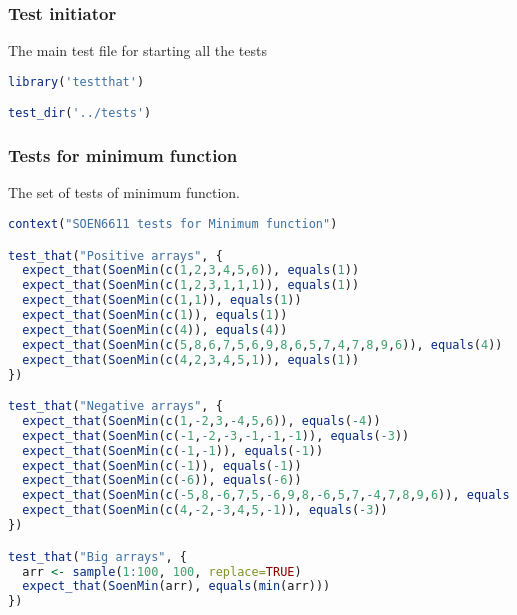 \documentclass[12pt]{article}
\begin{document}
\subsubsection{Test initiator}
The main test file for starting all the tests
\begin{lstlisting}[language=R]
library('testthat')

test_dir('../tests')
\end{lstlisting}
\subsubsection{Tests for minimum function}
The set of tests of minimum function.
\begin{lstlisting}[language=R]
context("SOEN6611 tests for Minimum function")

test_that("Positive arrays", {
  expect_that(SoenMin(c(1,2,3,4,5,6)), equals(1))
  expect_that(SoenMin(c(1,2,3,1,1,1)), equals(1))
  expect_that(SoenMin(c(1,1)), equals(1))
  expect_that(SoenMin(c(1)), equals(1))
  expect_that(SoenMin(c(4)), equals(4))
  expect_that(SoenMin(c(5,8,6,7,5,6,9,8,6,5,7,4,7,8,9,6)), equals(4))
  expect_that(SoenMin(c(4,2,3,4,5,1)), equals(1))
})

test_that("Negative arrays", {
  expect_that(SoenMin(c(1,-2,3,-4,5,6)), equals(-4))
  expect_that(SoenMin(c(-1,-2,-3,-1,-1,-1)), equals(-3))
  expect_that(SoenMin(c(-1,-1)), equals(-1))
  expect_that(SoenMin(c(-1)), equals(-1))
  expect_that(SoenMin(c(-6)), equals(-6))
  expect_that(SoenMin(c(-5,8,-6,7,5,-6,9,8,-6,5,7,-4,7,8,9,6)), equals(-6))
  expect_that(SoenMin(c(4,-2,-3,4,5,-1)), equals(-3))
})

test_that("Big arrays", {
  arr <- sample(1:100, 100, replace=TRUE)
  expect_that(SoenMin(arr), equals(min(arr)))
})
\end{lstlisting}
\end{document}
